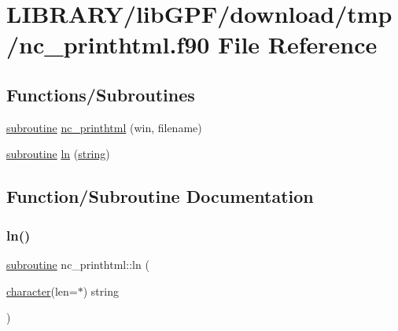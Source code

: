 \hypertarget{nc__printhtml_8f90}{}\section{L\+I\+B\+R\+A\+R\+Y/lib\+G\+P\+F/download/tmp/nc\+\_\+printhtml.f90 File Reference}
\label{nc__printhtml_8f90}
\subsection*{Functions/\+Subroutines}
\begin{DoxyCompactItemize}
\item 
\hyperlink{M__stopwatch_83_8txt_acfbcff50169d691ff02d4a123ed70482}{subroutine} \hyperlink{nc__printhtml_8f90_a32e95e7d4144cd8b7fb58ff6974441a8}{nc\+\_\+printhtml} (win, filename)
\item 
\hyperlink{M__stopwatch_83_8txt_acfbcff50169d691ff02d4a123ed70482}{subroutine} \hyperlink{nc__printhtml_8f90_a95070803517ce3fa7f43d9adcda31274}{ln} (\hyperlink{what__overview_81_8txt_a74cb7e955273b9f9157b4f0c18a38849}{string})
\end{DoxyCompactItemize}


\subsection{Function/\+Subroutine Documentation}
\mbox{\label{nc__printhtml_8f90_a95070803517ce3fa7f43d9adcda31274}} 
\subsubsection{\texorpdfstring{ln()}{ln()}}
{\footnotesize\ttfamily \hyperlink{M__stopwatch_83_8txt_acfbcff50169d691ff02d4a123ed70482}{subroutine} nc\+\_\+printhtml\+::ln (\begin{DoxyParamCaption}\item[{\hyperlink{option__stopwatch_83_8txt_abd4b21fbbd175834027b5224bfe97e66}{character}(len=$\ast$)}]{string }\end{DoxyParamCaption})}

\mbox{\label{nc__printhtml_8f90_a32e95e7d4144cd8b7fb58ff6974441a8}} 
